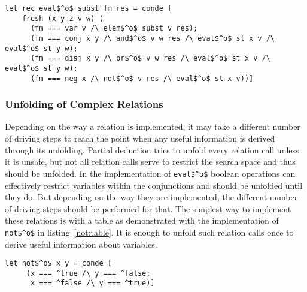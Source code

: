 \begin{figure*}[!h]
  \centering
  \begin{minipage}{0.85\textwidth}
    \begin{lstlisting}[label={eval:fst}, caption={Evaluator of formulas with boolean operation second}, captionpos=b, frame=tb]
  let rec eval$^o$ subst fm res = conde [
    fresh (x y z v w) (
      (fm === var v /\ elem$^o$ subst v res);
      (fm === conj x y /\ and$^o$ v w res /\ eval$^o$ st x v /\ eval$^o$ st y w);
      (fm === disj x y /\ or$^o$ v w res /\ eval$^o$ st x v /\ eval$^o$ st y w);
      (fm === neg x /\ not$^o$ v res /\ eval$^o$ st x v))]
    \end{lstlisting}
  \end{minipage}
\end{figure*}

\subsubsection{Unfolding of Complex Relations}

Depending on the way a relation is implemented, it may take a different number of driving steps to reach the point when any useful information is derived through its unfolding.
Partial deduction tries to unfold every relation call unless it is unsafe, but not all relation calls serve to restrict the search space and thus should be unfolded.
In the implementation of \lstinline{eval$^o$} boolean operations can effectively restrict variables within the conjunctions and should be unfolded until they do.
But depending on the way they are implemented, the different number of driving steps should be performed for that.
The simplest way to implement these relations is with a table as demonstrated with the implementation of \lstinline{not$^o$} in listing~\ref{not:table}.
It is enough to unfold such relation calls once to derive useful information about variables.

\begin{figure*}[!h]
  \centering
  \begin{minipage}{0.45\textwidth}
    \begin{lstlisting}[label={not:table}, caption={Implementation of boolean \lstinline{not} as a table}, captionpos=b, frame=tb]
  let not$^o$ x y = conde [
     (x === ^true /\ y === ^false;
      x === ^false /\ y === ^true)]
    \end{lstlisting}
  \end{minipage}
\end{figure*}

